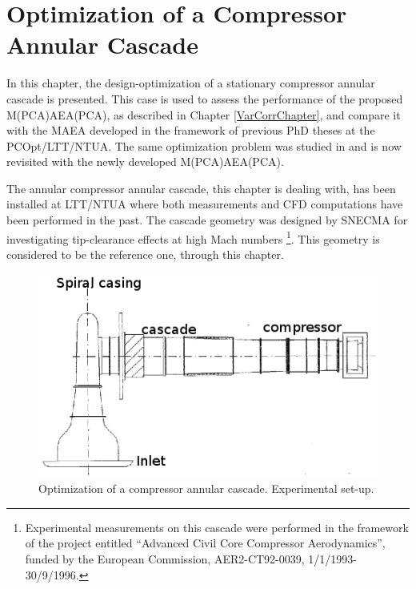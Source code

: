 \ifpdf
    \graphicspath{{6/figures/PNG/}{6/figures/PDF/}{6/figures/}}
\else
    \graphicspath{{6/figures/EPS/}{6/figures/}}
\fi


\chapter{Optimization of a Compressor Annular Cascade} %



In this chapter, the design-optimization of a stationary compressor annular cascade is presented. This case is used to assess the performance of the proposed M(PCA)AEA(PCA), as described in Chapter \ref{VarCorrChapter}, and compare it with the MAEA developed in the framework of previous PhD theses \cite{phd_Kampolis,phd_Giotis,phd_Karakasis} at the PCOpt/LTT/NTUA. The same optimization problem was studied in \cite{phd_Kampolis} and is now revisited with the newly developed M(PCA)AEA(PCA). 

The annular compressor annular cascade, this chapter is dealing with, has been installed at LTT/NTUA where both measurements  \cite{phd_doukelis,mathiou97}  and CFD computations \cite{politis98a} have been performed in the past. The cascade geometry was designed by SNECMA for investigating tip-clearance effects at high Mach numbers \footnote{Experimental measurements on this cascade were performed in the framework of the project entitled ``Advanced Civil Core Compressor Aerodynamics'', funded by the European Commission, AER2-CT92-0039, 1/1/1993-30/9/1996.}. This geometry is considered to be the reference one, through this chapter. 

\begin{figure}[h!]
\centering
\includegraphics[width=.8\textwidth]{experim.eps}
\caption{Optimization of a compressor annular cascade. Experimental set-up.}
\label{ntua_blade.experim}
\end{figure}


